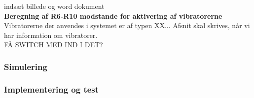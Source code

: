 indsæt billede og word dokument \\

\noindent\textbf{Beregning af R6-R10 modstande for aktivering af vibratorerne} \\
Vibratorerne der anvendes i systemet er af typen XX... Afsnit skal skrives, når vi har information om vibratorer.  \\

FÅ SWITCH MED IND I DET? \\

\subsubsection{Simulering}
\subsubsection{Implementering og test}
